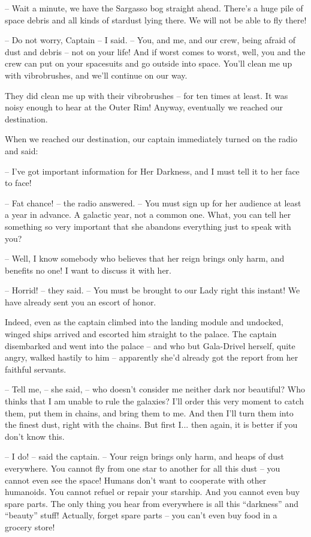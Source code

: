\documentclass[ebook,twoside,final,openright]{memoir}
\begin{document}
– Wait a minute, we have the Sargasso bog straight ahead. There's a huge pile of space debris and all kinds of stardust lying there. We will not be able to fly there!\par
– Do not worry, Captain – I said. – You, and me, and our crew, being afraid of dust and debris – not on your life! And if worst comes to worst, well, you and the crew can put on your spacesuits and go outside into space. You’ll clean me up with vibrobrushes, and we’ll continue on our way.\par
\par
They did clean me up with their vibrobrushes – for ten times at least. It was noisy enough to hear at the Outer Rim! Anyway, eventually we reached our destination.\par
\par
When we reached our destination, our captain immediately turned on the radio and said:\par
– I've got important information for Her Darkness, and I must tell it to her face to face!\par
– Fat chance! – the radio answered. – You must sign up for her audience at least a year in advance. A galactic year, not a common one. What, you can tell her something so very important that she abandons everything just to speak with you?\par
– Well, I know somebody who believes that her reign brings only harm, and benefits no one! I want to discuss it with her.\par
– Horrid! – they said. – You must be brought to our Lady right this instant! We have already sent you an escort of honor.\par
\par
Indeed, even as the captain climbed into the landing module and undocked, winged ships arrived and escorted him straight to the palace. The captain disembarked and went into the palace – and who but Gala-Drivel herself, quite angry, walked hastily to him – apparently she’d already got the report from her faithful servants.\par
– Tell me, – she said, – who doesn’t consider me neither dark nor beautiful? Who thinks that I am unable to rule the galaxies? I’ll order this very moment to catch them, put them in chains, and bring them to me. And then I’ll turn them into the finest dust, right with the chains. But first I... then again, it is better if you don’t know this.\par
– I do! – said the captain. – Your reign brings only harm, and heaps of dust everywhere. You cannot fly from one star to another for all this dust – you cannot even see the space! Humans don’t want to cooperate with other humanoids. You cannot refuel or repair your starship. And you cannot even buy spare parts. The only thing you hear from everywhere is all this “darkness” and “beauty” stuff! Actually, forget spare parts – you can’t even buy food in a grocery store!\par
\end{document}
